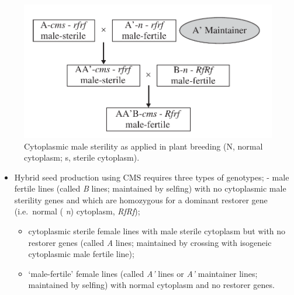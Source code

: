 \documentclass[11pt,ignorenonframetext,aspectratio=169]{beamer}
\providecommand{\tightlist}{%
  \setlength{\itemsep}{0pt}\setlength{\parskip}{0pt}}
\begin{document}
\begin{frame}{}
\protect\hypertarget{section-16}{}
\begin{figure}

{\centering \includegraphics[width=0.5\linewidth]{./images/cms_use} 

}

\caption{Cytoplasmic male sterility as applied in plant breeding (N, normal cytoplasm; s, sterile cytoplasm).}\label{fig:cms-use}
\end{figure}
\end{frame}

\begin{frame}{}
\protect\hypertarget{section-17}{}
\begin{itemize}
\tightlist
\item
  Hybrid seed production using CMS requires three types of genotypes; -
  male fertile lines (called \emph{B} lines; maintained by selfing) with
  no cytoplasmic male sterility genes and which are homozygous for a
  dominant restorer gene (i.e.~normal ( \emph{n}) cytoplasm,
  \emph{RfRf});

  \begin{itemize}
  \tightlist
  \item
    cytoplasmic sterile female lines with male sterile cytoplasm but
    with no restorer genes (called \emph{A} lines; maintained by
    crossing with isogeneic cytoplasmic male fertile line);
  \item
    `male-fertile' female lines (called \emph{A'} lines or \emph{A'}
    maintainer lines; maintained by selfing) with normal cytoplasm and
    no restorer genes.
  \end{itemize}
\end{itemize}
\end{frame}
\end{document}
